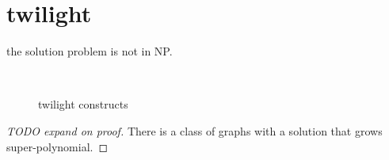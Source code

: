 \section{twilight}
\begin{theorem}
    the solution problem is not in NP.
\end{theorem}

\begin{figure}
  \mbox{
   }
  \caption{twilight constructs}
\end{figure}

\begin{proof}[TODO expand on proof]
    There is a class of graphs with a solution that grows super-polynomial.
\end{proof}